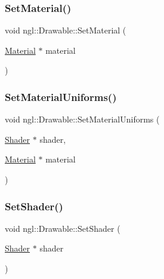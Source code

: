 \mbox{\label{classngl_1_1_drawable_a47c85d6217f8690704eb10ae0d8579b8}} 
\subsubsection{\texorpdfstring{Set\+Material()}{SetMaterial()}}
{\footnotesize\ttfamily void ngl\+::\+Drawable\+::\+Set\+Material (\begin{DoxyParamCaption}\item[{\mbox{\hyperlink{classngl_1_1_material}{Material}} $\ast$}]{material }\end{DoxyParamCaption})}

\mbox{\label{classngl_1_1_drawable_a6d09c1127610298df8ad1a053486b91c}} 
\subsubsection{\texorpdfstring{Set\+Material\+Uniforms()}{SetMaterialUniforms()}}
{\footnotesize\ttfamily void ngl\+::\+Drawable\+::\+Set\+Material\+Uniforms (\begin{DoxyParamCaption}\item[{\mbox{\hyperlink{classngl_1_1_shader}{Shader}} $\ast$}]{shader,  }\item[{\mbox{\hyperlink{classngl_1_1_material}{Material}} $\ast$}]{material }\end{DoxyParamCaption})\hspace{0.3cm}{\ttfamily [protected]}}

\mbox{\label{classngl_1_1_drawable_ac0ac2e82018a964140412a60d9405456}} 
\subsubsection{\texorpdfstring{Set\+Shader()}{SetShader()}}
{\footnotesize\ttfamily void ngl\+::\+Drawable\+::\+Set\+Shader (\begin{DoxyParamCaption}\item[{\mbox{\hyperlink{classngl_1_1_shader}{Shader}} $\ast$}]{shader }\end{DoxyParamCaption})}



